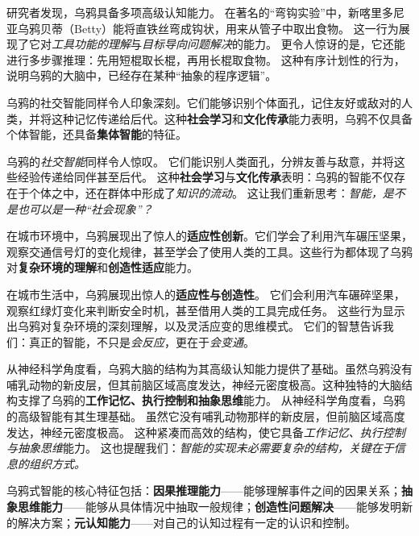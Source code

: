 研究者发现，乌鸦具备多项高级认知能力。
在著名的“弯钩实验”中，新喀里多尼亚乌鸦贝蒂（Betty）能将直铁丝弯成钩状，用来从管子中取出食物。
这一行为展现了它对\emph{工具功能的理解}与\emph{目标导向问题解决}的能力。
更令人惊讶的是，它还能进行多步骤推理：先用短棍取长棍，再用长棍取食物。
这种有序计划性的行为，说明乌鸦的大脑中，已经存在某种“抽象的程序逻辑”。

乌鸦的社交智能同样令人印象深刻。它们能够识别个体面孔，记住友好或敌对的人类，并将这种记忆传递给后代。这种\textbf{社会学习}和\textbf{文化传承}能力表明，乌鸦不仅具备个体智能，还具备\textbf{集体智能}的特征。

乌鸦的\emph{社交智能}同样令人惊叹。
它们能识别人类面孔，分辨友善与敌意，并将这些经验传递给同伴甚至后代。
这种\textbf{社会学习}与\textbf{文化传承}表明：乌鸦的智能不仅存在于个体之中，还在群体中形成了\emph{知识的流动}。
这让我们重新思考：\emph{智能，是不是也可以是一种“社会现象”？}

在城市环境中，乌鸦展现出了惊人的\textbf{适应性创新}。它们学会了利用汽车碾压坚果，观察交通信号灯的变化规律，甚至学会了使用人类的工具。这些行为都体现了乌鸦对\textbf{复杂环境的理解}和\textbf{创造性适应}能力。

在城市生活中，乌鸦展现出惊人的\textbf{适应性与创造性}。
它们会利用汽车碾碎坚果，观察红绿灯变化来判断安全时机，甚至借用人类的工具完成任务。
这些行为显示出乌鸦对复杂环境的深刻理解，以及灵活应变的思维模式。
它们的智慧告诉我们：真正的智能，不只是\emph{会反应}，更在于\emph{会变通}。

从神经科学角度看，乌鸦大脑的结构为其高级认知能力提供了基础。虽然乌鸦没有哺乳动物的新皮层，但其前脑区域高度发达，神经元密度极高。这种独特的大脑结构支撑了乌鸦的\textbf{工作记忆、执行控制和抽象思维}能力。
从神经科学角度看，乌鸦的高级智能有其生理基础。
虽然它没有哺乳动物那样的新皮层，但前脑区域高度发达，神经元密度极高。
这种紧凑而高效的结构，使它具备\emph{工作记忆、执行控制与抽象思维}能力。
这也提醒我们：\emph{智能的实现未必需要复杂的结构，关键在于信息的组织方式。}


乌鸦式智能的核心特征包括：\textbf{因果推理能力}——能够理解事件之间的因果关系；\textbf{抽象思维能力}——能够从具体情况中抽取一般规律；\textbf{创造性问题解决}——能够发明新的解决方案；\textbf{元认知能力}——对自己的认知过程有一定的认识和控制。

